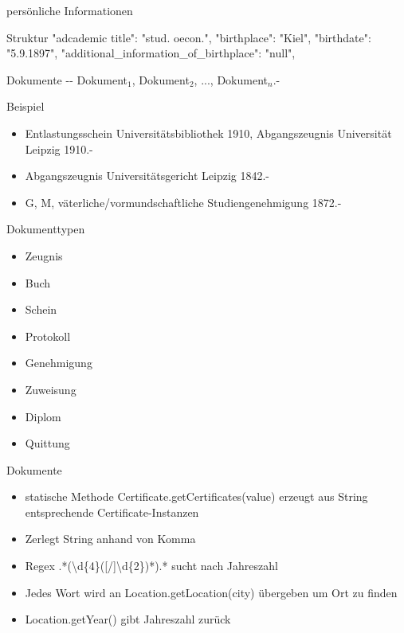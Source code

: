 \documentclass[12pt]{beamer}
\begin{document}
\begin{large}
\begin{frame}{persönliche Informationen}
 \begin{block}{Struktur}
  \normalsize
  \hspace*{0.5cm}
  "{}adcademic title"{}: "{}stud. oecon."{},
  \newline 
  \hspace*{0.5cm}    
  "{}birthplace"{}: "{}Kiel"{},
  \newline
  \hspace*{0.5cm}
  "{}birthdate"{}: "{}5.9.1897"{},    
  \newline
  \hspace*{0.5cm}
  "{}additional\_information\_of\_birthplace"{}: "{}null"{},
 \end{block} 
\end{frame}

\begin{frame}{Dokumente}
 -{}- Dokument$_1$, Dokument$_2$, ..., Dokument$_n$.-

 \vspace*{\fill}
 \begin{block}{Beispiel}
  \normalsize
  \begin{itemize}
   \item Entlastungsschein Universitätsbibliothek 1910, Abgangszeugnis Universität Leipzig 1910.-
   \item Abgangszeugnis Universitätsgericht Leipzig 1842.-
   \item G, M, väterliche/vormundschaftliche Studiengenehmigung 1872.-
  \end{itemize}
 \end{block}
\end{frame}

\begin{frame}{Dokumenttypen}
 \begin{itemize}
  \item Zeugnis
  \item Buch
  \item Schein
  \item Protokoll
  \item Genehmigung
  \item Zuweisung
  \item Diplom
  \item Quittung
 \end{itemize}
\end{frame}

\begin{frame}{Dokumente}
 \begin{itemize}
  \item statische Methode Certificate.getCertificates(value) erzeugt aus String entsprechende Certificate-Instanzen
  \item Zerlegt String anhand von Komma
  \item Regex .*(\textbackslash d\{4\}([/]\textbackslash d\{2\})*).* sucht nach Jahreszahl
  \item Jedes Wort wird an Location.getLocation(city) übergeben um Ort zu finden
  \item Location.getYear() gibt Jahreszahl zurück
 \end{itemize}
\end{frame}


\end{large}
\end{document}
